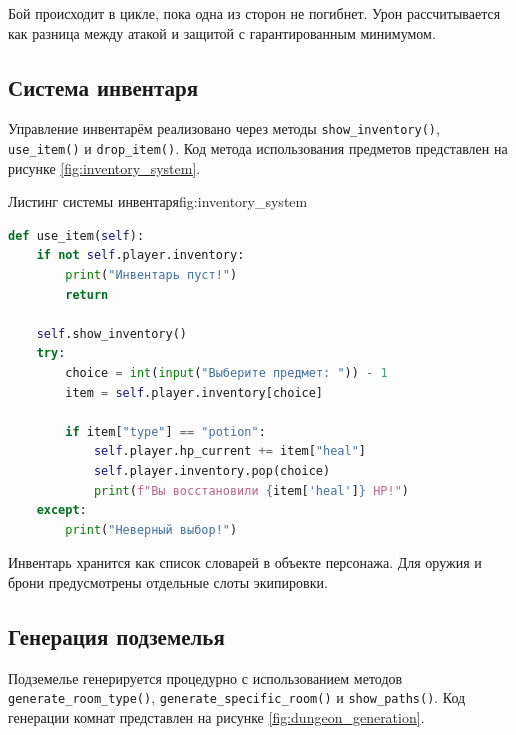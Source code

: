 \documentclass[]{vvsu}
\begin{document}
Бой происходит в цикле, пока одна из сторон не погибнет. Урон рассчитывается как разница между атакой и защитой с гарантированным минимумом.

\subsection{Система инвентаря}

Управление инвентарём реализовано через методы \texttt{show\_inventory()}, \texttt{use\_item()} и \texttt{drop\_item()}. Код метода использования предметов представлен на рисунке \ref{fig:inventory_system}.

\begin{vvsu_figure}{Листинг системы инвентаря}{fig:inventory_system}
  \begin{minipage}{.95\textwidth}
    \begin{lstlisting}[language=Python]
def use_item(self):
    if not self.player.inventory:
        print("Инвентарь пуст!")
        return
    
    self.show_inventory()
    try:
        choice = int(input("Выберите предмет: ")) - 1
        item = self.player.inventory[choice]
        
        if item["type"] == "potion":
            self.player.hp_current += item["heal"]
            self.player.inventory.pop(choice)
            print(f"Вы восстановили {item['heal']} HP!")
    except:
        print("Неверный выбор!")
    \end{lstlisting}
  \end{minipage}
\end{vvsu_figure}

Инвентарь хранится как список словарей в объекте персонажа. Для оружия и брони предусмотрены отдельные слоты экипировки.

\subsection{Генерация подземелья}

Подземелье генерируется процедурно с использованием методов \texttt{generate\_room\_type()}, \texttt{generate\_specific\_room()} и \texttt{show\_paths()}. Код генерации комнат представлен на рисунке \ref{fig:dungeon_generation}.
\end{document}
